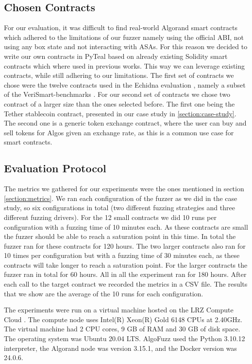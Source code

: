 \subsection*{Chosen Contracts}
For our evaluation, it was difficult to find real-world Algorand smart contracts which adhered to the limitations of our fuzzer namely using the official \ac{ABI}, not using any box state and not interacting with \acp{ASA}.
For this reason we decided to write our own contracts in PyTeal based on already existing Solidity smart contracts which where used in previous works.
This way we can leverage existing contracts, while still adhering to our limitations.
The first set of contracts we chose were the twelve contracts used in the Echidna evaluation \cite{grieco_echidna_2020}, namely a subset of the VeriSmart-benchmarks \cite{noauthor_kuplverismart-benchmarks_nodate}.
For our second set of contracts we chose two contract of a larger size than the ones selected before.
The first one being the Tether stablecoin contract, presented in our case study in \ref{section:case-study}.
The second one is a generic token exchange contract, where the user can buy and sell tokens for Algos given an exchange rate, as this is a common use case for smart contracts.

\subsection*{Evaluation Protocol}
The metrics we gathered for our experiments were the ones mentioned in section \ref{section:metrics}.
We ran each configuration of the fuzzer as we did in the case study, so six configurations in total (two different fuzzing strategies and three different fuzzing drivers).
For the 12 small contracts we did 10 runs per configuration with a fuzzing time of 10 minutes each.
As these contracts are small the fuzzer should be able to reach a saturation point in this time.
In total the fuzzer ran for these contracts for 120 hours.
The two larger contracts also ran for 10 times per configuration but with a fuzzing time of 30 minutes each, as these contracts will take longer to reach a saturation point.
For the larger contracts the fuzzer ran in total for 60 hours.
All in all the experiment ran for 180 hours. After each call to the target contract we recorded the metrics in a \acs{CSV} file. The results that we show are the average of the 10 runs for each configuration.

The experiments were run on a virtual machine hosted on the LRZ Compute Cloud \cite{noauthor_lrz_nodate}.
The compute node uses Intel(R) Xeon(R) Gold 6148 CPUs at 2.40GHz.
The virtual machine had 2 CPU cores, 9 GB of RAM and 30 GB of disk space.
The operating system was Ubuntu 20.04 LTS.
AlgoFuzz used the Python 3.10.12 interpreter, the Algorand node was version 3.15.1, and the Docker version was 24.0.6.

